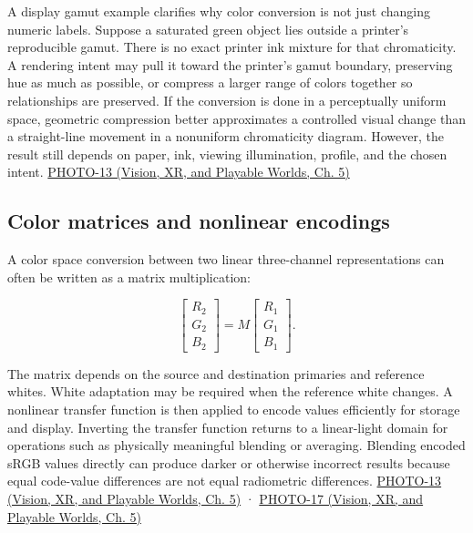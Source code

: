 A display gamut example clarifies why color conversion is not just changing numeric labels. Suppose a saturated green object lies outside a printer's reproducible gamut. There is no exact printer ink mixture for that chromaticity. A rendering intent may pull it toward the printer's gamut boundary, preserving hue as much as possible, or compress a larger range of colors together so relationships are preserved. If the conversion is done in a perceptually uniform space, geometric compression better approximates a controlled visual change than a straight-line movement in a nonuniform chromaticity diagram. However, the result still depends on paper, ink, viewing illumination, profile, and the chosen intent. \href{../07-Vision-XR-and-Playable-Worlds/main.pdf\#nameddest=04-visual-computing-ii-ch036-photo-13---photography-session-13}{PHOTO-13 (Vision, XR, and Playable Worlds, Ch. 5)}

\subsection{Color matrices and nonlinear encodings}\label{03-visual-computing-i-ch004-color-matrices-and-nonlinear-encodings}

\hypertarget{03-visual-computing-i-ch004-color-matrices-and-nonlinear-encodings}{}

A color space conversion between two linear three-channel representations can often be written as a matrix multiplication:

\[
\begin{bmatrix}R_2\\G_2\\B_2\end{bmatrix}
=M\begin{bmatrix}R_1\\G_1\\B_1\end{bmatrix}.
\]

The matrix depends on the source and destination primaries and reference whites. White adaptation may be required when the reference white changes. A nonlinear transfer function is then applied to encode values efficiently for storage and display. Inverting the transfer function returns to a linear-light domain for operations such as physically meaningful blending or averaging. Blending encoded sRGB values directly can produce darker or otherwise incorrect results because equal code-value differences are not equal radiometric differences. \href{../07-Vision-XR-and-Playable-Worlds/main.pdf\#nameddest=04-visual-computing-ii-ch036-photo-13---photography-session-13}{PHOTO-13 (Vision, XR, and Playable Worlds, Ch. 5)} · \href{../07-Vision-XR-and-Playable-Worlds/main.pdf\#nameddest=04-visual-computing-ii-ch036-photo-17---photography-session-17}{PHOTO-17 (Vision, XR, and Playable Worlds, Ch. 5)}

